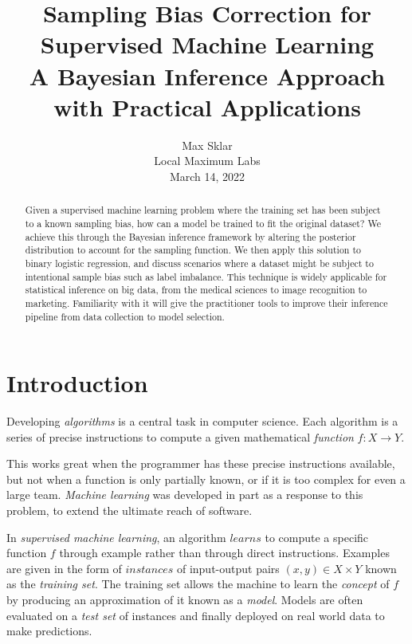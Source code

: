 \documentclass[twoside]{article}
\begin{document}
\parindent=0in
\parskip=12pt


\title{
  Sampling Bias Correction for Supervised Machine Learning \\
  \large{
    A Bayesian Inference Approach with Practical Applications
  }
}

\author{Max Sklar\\ Local Maximum Labs \\ March 14, 2022}
\date{}

\maketitle
\thispagestyle{empty}

\begin{abstract}
Given a supervised machine learning problem where the training set has been subject to a known sampling bias, how can a model be trained to fit the original dataset? We achieve this through the Bayesian inference framework by altering the posterior distribution to account for the sampling function. We then apply this solution to binary logistic regression, and discuss scenarios where a dataset might be subject to intentional sample bias such as label imbalance. This technique is widely applicable for statistical inference on big data, from the medical sciences to image recognition to marketing. Familiarity with it will give the practitioner tools to improve their inference pipeline from data collection to model selection. 
\end{abstract}

\section{Introduction}
\label{section:introduction}

Developing \textit{algorithms} is a central task in computer science. Each algorithm is a series of precise instructions to compute a given mathematical \textit{function} \(f: X \to Y\).

This works great when the programmer has these precise instructions available, but not when a function is only partially known, or if it is too complex for even a large team. \textit{Machine learning} was developed in part as a response to this problem, to extend the ultimate reach of software. 

In \textit{supervised machine learning}, an algorithm \(learns\) to compute a specific function \(f\) through example rather than through direct instructions. Examples are given in the form of \(instances\) of input-output pairs \((x, y) \in X \times Y\) known as the \textit{training set}. The training set allows the machine to learn the \textit{concept} of \(f\) by producing an approximation of it known as a \textit{model}. Models are often evaluated on a \textit{test set} of instances and finally deployed on real world data to make predictions.
\end{document}
